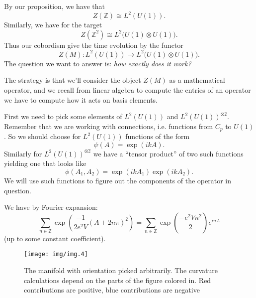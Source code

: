 By our proposition, we have that
\begin{equation}%
Z(\mathbb{Z})\cong L^{2}(U(1)).
\end{equation}
Similarly, we have for the target
\begin{equation}%
Z(\mathbb{Z}^{2})\cong L^{2}\Big(U(1)\otimes U(1)\Big).
\end{equation}
Thus our cobordism give the time evolution by the functor
\begin{equation}%
Z(M): L^{2}(U(1))\to L^{2}\Big(U(1)\otimes U(1)\Big).
\end{equation}
The question we want to answer is: \emph{how exactly does it
  work?}

The strategy is that we'll consider the object $Z(M)$ as a
mathematical operator, and we recall from linear algebra to
compute the entries of an operator we have to compute how it acts
on basis elements. 

First we need to pick some elements of $L^{2}(U(1))$ and
$L^{2}(U(1))^{\otimes 2}$. Remember that we are working
with connections, i.e. functions from $C_{p}$ to $U(1)$. So we
should choose for $L^{2}(U(1))$ functions of the form
\begin{equation}%
\psi(A) = \exp(ikA).
\end{equation}
Similarly for $L^{2}(U(1))^{\otimes 2}$ we have a
``tensor product'' of two such functions yielding one that looks
like
\begin{equation}%
\phi(A_{1},A_{2}) = \exp(ikA_{1})\exp(ikA_{2}).
\end{equation}
We will use such functions to figure out the components of the
operator in question.

\begin{prop}\label{prop:fourierExpansionThetaFunction}
We have by Fourier expansion:
\begin{equation}%
\sum_{n\in\mathbb{Z}}\exp\left(\frac{-1}{2e^{2}V}(A+2n\pi)^{2}\right)
= \sum_{n\in\mathbb{Z}}\exp\left(\frac{-e^{2}Vn^{2}}{2}\right)e^{inA}
\end{equation}
(up to some constant coefficient).
\end{prop}

\begin{figure}[t]
\texttt{[image: img/img.4]}
\caption{The manifold with orientation picked arbitrarily. The
  curvature calculations depend on the parts of the figure
  colored in. Red contributions are positive, blue contributions
  are negative}\label{fig:img4}
\end{figure}


